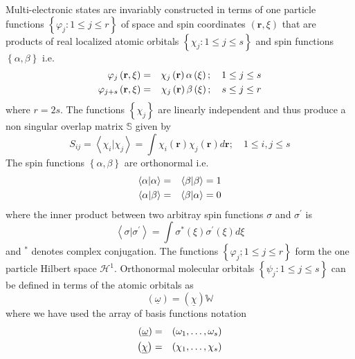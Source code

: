 \documentclass{article}
\begin{document}
Multi-electronic states are invariably constructed in terms of one particle
functions $\left\{ \varphi _{j}:1\leq j\leq r\right\} $ of space and spin
coordinates $\left( \mathbf{r},\xi \right) $ that are products of real
localized atomic orbitals $\left\{ \chi _{j}:1\leq j\leq s\right\} $ and
spin functions $\left\{ \alpha ,\beta \right\} $ i.e.%
\begin{eqnarray}
\varphi _{j}\left( \mathbf{r},\xi \right) &=&\chi _{j}\left( \mathbf{r}%
\right) \alpha \left( \xi \right) ;\quad 1\leq j\leq s  \notag \\
\varphi _{j+s}\left( \mathbf{r},\xi \right) &=&\chi _{j}\left( \mathbf{r}%
\right) \beta \left( \xi \right) ;\quad s\leq j\leq r
\end{eqnarray}%
where $r=2s$. The functions $\left\{ \chi _{j}\right\} $ are linearly
independent and thus produce a non singular overlap matrix $\mathbb{S}$
given by 
\begin{equation}
S_{ij}=\left\langle \chi _{i}|\chi _{j}\right\rangle =\int \chi _{i}\left( 
\mathbf{r}\right) \chi _{j}\left( \mathbf{r}\right) d\mathbf{r;\quad }1\leq
i,j\leq s
\end{equation}%
The spin functions $\left\{ \alpha ,\beta \right\} $ are orthonormal i.e. 
\begin{eqnarray}
\left\langle \alpha |\alpha \right\rangle &=&\left\langle \beta |\beta
\right\rangle =1  \notag \\
\left\langle \alpha |\beta \right\rangle &=&\left\langle \beta |\alpha
\right\rangle =0
\end{eqnarray}%
where the inner product between two arbitray spin functions $\sigma $ and $%
\sigma ^{\prime }$ is 
\begin{equation}
\left\langle \sigma |\sigma ^{\prime }\right\rangle =\int \sigma ^{\ast
}\left( \xi \right) \sigma ^{\prime }\left( \xi \right) d\xi
\end{equation}%
and $^{\ast }$ denotes complex conjugation. The functions $\left\{ \varphi
_{j};1\leq j\leq r\right\} $ form the one particle Hilbert space $\mathcal{H}%
^{1}$. Orthonormal molecular orbitals $\left\{ \psi _{j}:1\leq j\leq
s\right\} $ can be defined in terms of the atomic orbitals as 
\begin{equation}
\left( \underline{\omega }\right) =\left( \underline{\chi }\right) \mathbb{W}
\end{equation}%
where we have used the array of basis functions notation 
\begin{eqnarray}
\left( \underline{\omega }\right) &=&\left( \omega _{1},\ldots ,\omega
_{s}\right)  \notag \\
\left( \underline{\chi }\right) &=&\left( \chi _{1},\ldots ,\chi _{s}\right)
\end{eqnarray}%
\end{document}
